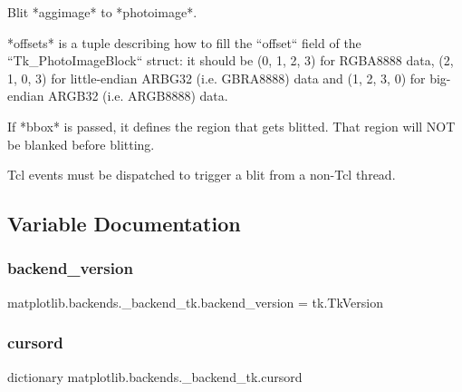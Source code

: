 \begin{DoxyVerb}Blit *aggimage* to *photoimage*.

*offsets* is a tuple describing how to fill the ``offset`` field of the
``Tk_PhotoImageBlock`` struct: it should be (0, 1, 2, 3) for RGBA8888 data,
(2, 1, 0, 3) for little-endian ARBG32 (i.e. GBRA8888) data and (1, 2, 3, 0)
for big-endian ARGB32 (i.e. ARGB8888) data.

If *bbox* is passed, it defines the region that gets blitted. That region
will NOT be blanked before blitting.

Tcl events must be dispatched to trigger a blit from a non-Tcl thread.
\end{DoxyVerb}
 

\subsection{Variable Documentation}
\mbox{\label{namespacematplotlib_1_1backends_1_1__backend__tk_ad8b7798437f407c3536f23a2005684ff}} 
\subsubsection{\texorpdfstring{backend\+\_\+version}{backend\_version}}
{\footnotesize\ttfamily matplotlib.\+backends.\+\_\+backend\+\_\+tk.\+backend\+\_\+version = tk.\+Tk\+Version}

\mbox{\label{namespacematplotlib_1_1backends_1_1__backend__tk_af56246acc7da1bc6b214ded219324136}} 
\subsubsection{\texorpdfstring{cursord}{cursord}}
{\footnotesize\ttfamily dictionary matplotlib.\+backends.\+\_\+backend\+\_\+tk.\+cursord}

